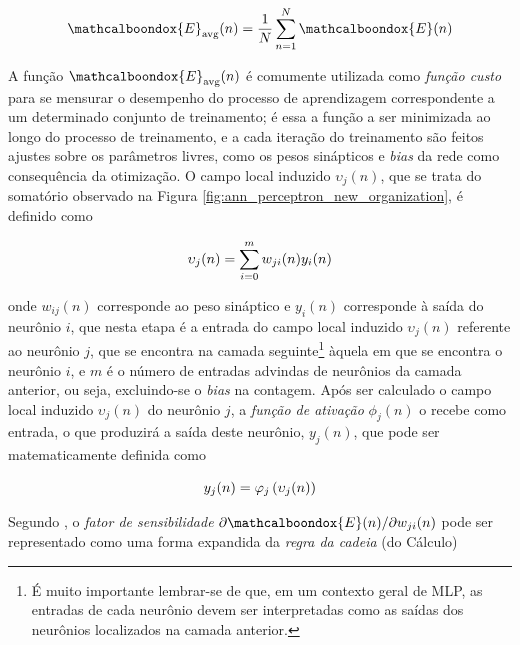 
\begin{equation}
    \mathcalboondox{E}_{\text{avg}}(n) = \dfrac{1}{N} \sum_{n=1}^{N} \mathcalboondox{E}(n)
    \label{eq:ann_avg_squared_error_energy}
    \vspace{0.2cm}
\end{equation}

A função $\mathcalboondox{E}_{\text{avg}}(n)$ é comumente utilizada como \textit{função custo} para se mensurar o desempenho do processo de aprendizagem correspondente a um determinado conjunto de treinamento; é essa a função a ser minimizada ao longo do processo de treinamento, e a cada iteração do treinamento são feitos ajustes sobre os parâmetros livres, como os pesos sinápticos e \textit{bias} da rede como consequência da otimização. O campo local induzido $\upsilon_{j}(n)$, que se trata do somatório observado na Figura \ref{fig:ann_perceptron_new_organization}, é definido como

\begin{equation}
    \upsilon_{j}(n) = \sum_{i=0}^{m} w_{ji}(n) y_{i}(n)
    \label{eq:ann_induced_local_field}
    \vspace{0.2cm}
\end{equation}

\noindent onde $w_{ij}(n)$ corresponde ao peso sináptico e $y_{i}(n)$ corresponde à saída do neurônio $i$, que nesta etapa é a entrada do campo local induzido $\upsilon_{j}(n)$ referente ao neurônio $j$, que se encontra na camada seguinte\footnote{É muito importante lembrar-se de que, em um contexto geral de MLP, as entradas de cada neurônio devem ser interpretadas como as saídas dos neurônios localizados na camada anterior.} àquela em que se encontra o neurônio $i$, e $m$ é o número de entradas advindas de neurônios da camada anterior, ou seja, excluindo-se o \textit{bias} na contagem. Após ser calculado o campo local induzido $\upsilon_{j}(n)$ do neurônio $j$, a \textit{função de ativação} $\phi_{j}(n)$ o recebe como entrada, o que produzirá a saída deste neurônio, $y_{j}(n)$, que pode ser matematicamente definida como

\begin{equation}
    y_{j}(n) = \varphi_{j}\left(\upsilon_{j}(n)\right)
    \label{eq:ann_neuron_output}
    \vspace{0.2cm}
\end{equation}

Segundo \citep{haykin1999neural}, o \textit{fator de sensibilidade} $\partial \mathcalboondox{E}(n) / \partial w_{ji}(n)$ pode ser representado como uma forma expandida da \textit{regra da cadeia} (do Cálculo)

